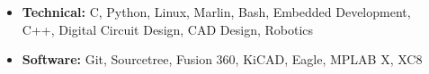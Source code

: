 \documentclass[
	10pt, %
]{FreemanCV}
\begin{document}
\begin{paracol}{2}
\begin{itemize}[leftmargin=10pt]
	\itemsep0pt
	\item \textbf{Technical:} C, Python, Linux, Marlin, Bash, Embedded Development,\\
	\hspace*{45pt}C++, Digital Circuit Design, CAD Design, Robotics
	\item \textbf{Software:} Git, Sourcetree, Fusion 360, KiCAD, Eagle, MPLAB X, XC8
\end{itemize}







	
	
	
	

\end{paracol}
\end{document}
